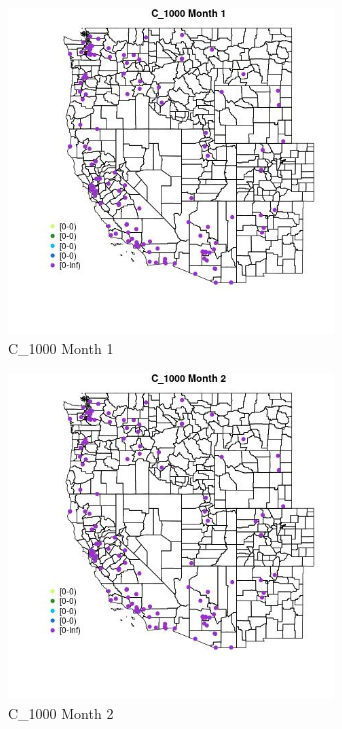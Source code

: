 \begin{figure} 
\centering  
\includegraphics[width=0.77\textwidth]{Code_Outputs/Report_ML_input_PM25_Step4_part_e_de_duplicated_aves_MapObsMo1C_1000.jpg} 
\caption{\label{fig:Report_ML_input_PM25_Step4_part_e_de_duplicated_avesMapObsMo1C_1000}C_1000 Month 1} 
\end{figure} 
 

\begin{figure} 
\centering  
\includegraphics[width=0.77\textwidth]{Code_Outputs/Report_ML_input_PM25_Step4_part_e_de_duplicated_aves_MapObsMo2C_1000.jpg} 
\caption{\label{fig:Report_ML_input_PM25_Step4_part_e_de_duplicated_avesMapObsMo2C_1000}C_1000 Month 2} 
\end{figure} 
 

